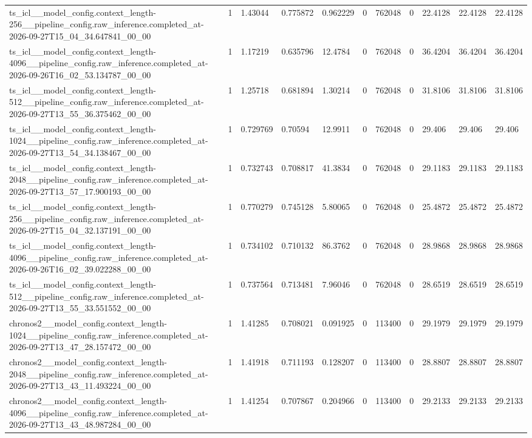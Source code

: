 \begin{tabular}{lllllllllll}
ts\_icl\_\_model\_config.context\_length-256\_\_pipeline\_config.raw\_inference.completed\_at-2026-09-27T15\_04\_34.647841\_00\_00 & 1 & 1.43044 & 0.775872 & 0.962229 & 0 & 762048 & 0 & 22.4128 & 22.4128 & 22.4128 \\
ts\_icl\_\_model\_config.context\_length-4096\_\_pipeline\_config.raw\_inference.completed\_at-2026-09-26T16\_02\_53.134787\_00\_00 & 1 & 1.17219 & 0.635796 & 12.4784 & 0 & 762048 & 0 & 36.4204 & 36.4204 & 36.4204 \\
ts\_icl\_\_model\_config.context\_length-512\_\_pipeline\_config.raw\_inference.completed\_at-2026-09-27T13\_55\_36.375462\_00\_00 & 1 & 1.25718 & 0.681894 & 1.30214 & 0 & 762048 & 0 & 31.8106 & 31.8106 & 31.8106 \\
ts\_icl\_\_model\_config.context\_length-1024\_\_pipeline\_config.raw\_inference.completed\_at-2026-09-27T13\_54\_34.138467\_00\_00 & 1 & 0.729769 & 0.70594 & 12.9911 & 0 & 762048 & 0 & 29.406 & 29.406 & 29.406 \\
ts\_icl\_\_model\_config.context\_length-2048\_\_pipeline\_config.raw\_inference.completed\_at-2026-09-27T13\_57\_17.900193\_00\_00 & 1 & 0.732743 & 0.708817 & 41.3834 & 0 & 762048 & 0 & 29.1183 & 29.1183 & 29.1183 \\
ts\_icl\_\_model\_config.context\_length-256\_\_pipeline\_config.raw\_inference.completed\_at-2026-09-27T15\_04\_32.137191\_00\_00 & 1 & 0.770279 & 0.745128 & 5.80065 & 0 & 762048 & 0 & 25.4872 & 25.4872 & 25.4872 \\
ts\_icl\_\_model\_config.context\_length-4096\_\_pipeline\_config.raw\_inference.completed\_at-2026-09-26T16\_02\_39.022288\_00\_00 & 1 & 0.734102 & 0.710132 & 86.3762 & 0 & 762048 & 0 & 28.9868 & 28.9868 & 28.9868 \\
ts\_icl\_\_model\_config.context\_length-512\_\_pipeline\_config.raw\_inference.completed\_at-2026-09-27T13\_55\_33.551552\_00\_00 & 1 & 0.737564 & 0.713481 & 7.96046 & 0 & 762048 & 0 & 28.6519 & 28.6519 & 28.6519 \\
chronos2\_\_model\_config.context\_length-1024\_\_pipeline\_config.raw\_inference.completed\_at-2026-09-27T13\_47\_28.157472\_00\_00 & 1 & 1.41285 & 0.708021 & 0.091925 & 0 & 113400 & 0 & 29.1979 & 29.1979 & 29.1979 \\
chronos2\_\_model\_config.context\_length-2048\_\_pipeline\_config.raw\_inference.completed\_at-2026-09-27T13\_43\_11.493224\_00\_00 & 1 & 1.41918 & 0.711193 & 0.128207 & 0 & 113400 & 0 & 28.8807 & 28.8807 & 28.8807 \\
chronos2\_\_model\_config.context\_length-4096\_\_pipeline\_config.raw\_inference.completed\_at-2026-09-27T13\_43\_48.987284\_00\_00 & 1 & 1.41254 & 0.707867 & 0.204966 & 0 & 113400 & 0 & 29.2133 & 29.2133 & 29.2133 \\

\end{tabular}
